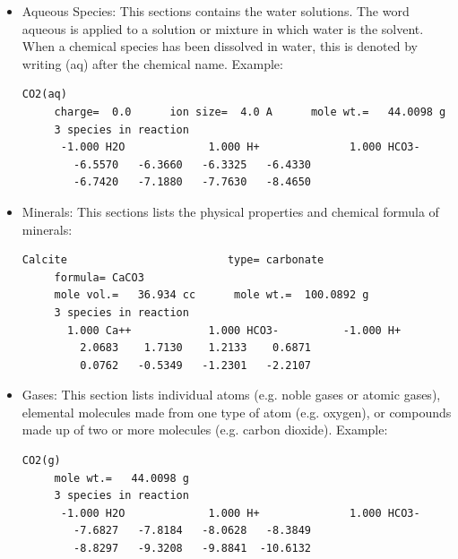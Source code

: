 \begin{itemize}
\item Aqueous Species: This sections contains the water solutions. The word aqueous is applied to a solution or mixture in which water is the solvent. When a chemical species has been dissolved in water, this is denoted by writing (aq) after the chemical name. Example:

\begin{minipage}[c]{0.92\textwidth}
\begin{lstlisting}[frame=single, caption=Excerpt of the section Aqueous Species]
CO2(aq)
     charge=  0.0      ion size=  4.0 A      mole wt.=   44.0098 g
     3 species in reaction
      -1.000 H2O             1.000 H+              1.000 HCO3-
        -6.5570   -6.3660   -6.3325   -6.4330
        -6.7420   -7.1880   -7.7630   -8.4650
\end{lstlisting}
\end{minipage}

\item Minerals: This sections lists the physical properties and chemical formula of minerals: 

\begin{minipage}[c]{0.92\textwidth}
\begin{lstlisting}[frame=single, caption=Excerpt of the section Minerals]
Calcite                         type= carbonate
     formula= CaCO3
     mole vol.=   36.934 cc      mole wt.=  100.0892 g
     3 species in reaction
       1.000 Ca++            1.000 HCO3-          -1.000 H+
         2.0683    1.7130    1.2133    0.6871
         0.0762   -0.5349   -1.2301   -2.2107
\end{lstlisting}
\end{minipage}

\item Gases: This section lists individual atoms (e.g. noble gases or atomic gases), elemental molecules made from one type of atom (e.g. oxygen), or compounds made up of two or more molecules (e.g. carbon dioxide). Example: 

\begin{minipage}[c]{0.92\textwidth}
\begin{lstlisting}[frame=single, caption=Excerpt of the section Gases]
CO2(g)
     mole wt.=   44.0098 g
     3 species in reaction
      -1.000 H2O             1.000 H+              1.000 HCO3-
        -7.6827   -7.8184   -8.0628   -8.3849
        -8.8297   -9.3208   -9.8841  -10.6132
\end{lstlisting}
\end{minipage}


\end{itemize}

